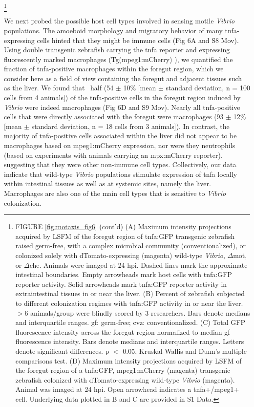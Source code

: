 {{{{{{\let\thefootnote\relax\footnote{FIGURE \ref{fig:motaxis_fig6} (cont'd) (A) Maximum intensity projections acquired by LSFM of the foregut region of tnfa:GFP transgenic zebrafish raised germ-free, with a complex microbial community (conventionalized), or colonized solely with dTomato-expressing (magenta) wild-type \textit{Vibrio}, $\Delta$mot, or $\Delta$che. Animals were imaged at 24 hpi. Dashed lines mark the approximate intestinal boundaries. Empty arrowheads mark host cells with tnfa:GFP reporter activity. Solid arrowheads mark tnfa:GFP reporter activity in extraintestinal tissues in or near the liver. (B) Percent of zebrafish subjected to different colonization regimes with tnfa:GFP activity in or near the liver. $ > $6 animals/group were blindly scored by 3 researchers. Bars denote medians and interquartile ranges. gf: germ-free; cvz: conventionalized. (C) Total GFP fluorescence intensity across the foregut region normalized to median gf fluorescence intensity. Bars denote medians and interquartile ranges. Letters denote significant differences. p $ < $ 0.05, Kruskal-Wallis and Dunn's multiple comparisons test. (D) Maximum intensity projections acquired by LSFM of the foregut region of a tnfa:GFP, mpeg1:mCherry (magenta) transgenic zebrafish colonized with dTomato-expressing wild-type \textit{Vibrio} (magenta). Animal was imaged at 24 hpi. Open arrowhead indicates a tnfa+/mpeg1+ cell. Underlying data plotted in B and C are provided in S1 Data.}

We next probed the possible host cell types involved in sensing motile \textit{Vibrio} populations. The amoeboid morphology and migratory behavior of many tnfa-expressing cells hinted that they might be immune cells (Fig 6A and S8 Mov). Using double transgenic zebrafish carrying the tnfa reporter and expressing fluorescently marked macrophages (Tg(mpeg1:mCherry) \cite{ellett_mpeg1_2011}), we quantified the fraction of tnfa-positive macrophages within the foregut region, which we consider here as a field of view containing the foregut and adjacent tissues such as the liver. We found that ~half (54 $\pm$ 10\% [mean $\pm$ standard deviation, n = 100 cells from 4 animals]) of the tnfa-positive cells in the foregut region induced by \textit{Vibrio} were indeed macrophages (Fig 6D and S9 Mov). Nearly all tnfa-positive cells that were directly associated with the foregut were macrophages (93 $\pm$ 12\% [mean $\pm$ standard deviation, n = 18 cells from 3 animals]). In contrast, the majority of tnfa-positive cells associated within the liver did not appear to be macrophages based on mpeg1:mCherry expression, nor were they neutrophils (based on experiments with animals carrying an mpx:mCherry reporter), suggesting that they were other non-immune cell types. Collectively, our data indicate that wild-type \textit{Vibrio} populations stimulate expression of tnfa locally within intestinal tissues as well as at systemic sites, namely the liver. Macrophages are also one of the main cell types that is sensitive to \textit{Vibrio} colonization.


}}}}}}
